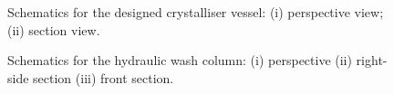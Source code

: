 \begin{figure}[h]
    \centering
    
    \caption{Schematics for the designed crystalliser vessel: (i) perspective view; (ii) section view.}
    \label{fig:crystalliser schematic executive}
\end{figure}

\begin{figure}[h]
    \centering
    
    \caption{Schematics for the hydraulic wash column: (i) perspective (ii) right-side section (iii) front section.}
    \label{fig:wash column schematic executive}
\end{figure}

